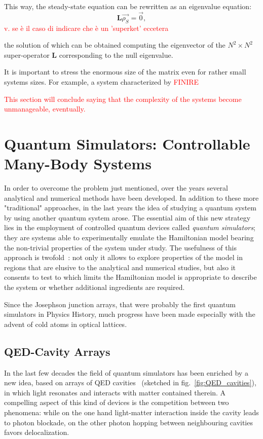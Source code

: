 This way, the steady-state equation can be rewritten as an eigenvalue equation:
\begin{equation}
    \textbf{L}\vec{\rho_S} = \vec{0},
\end{equation}
\textcolor{red}{v. se è il caso di indicare che è un 'superket' eccetera}

the solution of which can be obtained computing the eigenvector of the $N^2 \times N^2$ super-operator \textbf{L} corresponding to the null eigenvalue.

It is important to stress the enormous size of the matrix even for rather small systems sizes. For example, a system characterized by \textcolor{red}{FINIRE}


\textcolor{red}{This section will conclude saying that the complexity of the systems become unmanageable, eventually.}

\section{Quantum Simulators: Controllable Many-Body Systems}
In order to overcome the problem just mentioned, over the years several analytical and numerical methods have been developed. In addition to these more "traditional" approaches, in the last years the idea of studying a quantum system by using another quantum system arose. The essential aim of this new strategy lies in the employment of controlled quantum devices called \emph{quantum simulators}; they are systems able to experimentally emulate the Hamiltonian model bearing the non-trivial properties of the system under study. The usefulness of this approach is twofold~\cite{Tomadin_Fazio}:  not only it allows to explore properties of the model in regions that are elusive to the analytical and numerical studies, but also it consents to test to which limits the Hamiltonian model is appropriate to describe the system or whether additional ingredients are required.

Since the Josephson junction arrays, that were probably the first quantum simulators in Physics History, much progress have been made especially with the advent of cold atoms in optical lattices.

\subsection{QED-Cavity Arrays}
In the last few decades the field of quantum simulators has been enriched by a new idea, based on arrays of QED cavities~\cite{Tomadin_Fazio} (sketched in fig.~\ref{fig:QED_cavities}), in which light resonates and interacts with matter contained therein.  A compelling aspect of this kind of devices is the competition between two phenomena: while on the one hand light-matter interaction inside the cavity leads to photon blockade, on the other photon hopping between neighbouring cavities favors delocalization.

